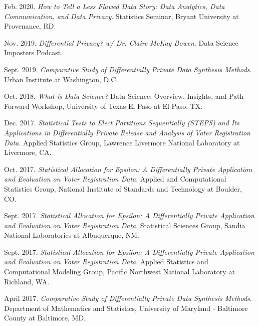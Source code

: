 \documentclass[11pt, letterpaper, roman]{moderncv} %
\begin{document}
\begin{etaremune}[topsep=0pt, itemsep=6pt, partopsep=0pt, parsep=0pt]
  \item Feb. 2020. \textit{How to Tell a Less Flawed Data Story: Data Analytics, Data Communication, and Data Privacy}. Statistics Seminar, Bryant University at Provenance, RD.
  
  \item Nov. 2019. \textit{Differential Privacy? w/ Dr. Claire McKay Bowen}. Data Science Imposters Podcast.
  
  \item Sept. 2019. \textit{Comparative Study of Differentially Private Data Synthesis Methods}. Urban Institute at Washington, D.C.
  
  \item Oct. 2018. \textit{What is Data Science?} Data Science: Overview, Insights, and Path Forward Workshop, University of Texas-El Paso at El Paso, TX.

  \item Dec. 2017. \textit{Statistical Tests to Elect Partitions Sequentially (STEPS) and Its Applications in Differentially Private Release and Analysis of Voter Registration Data}. Applied Statistics Group, Lawrence Livermore National Laboratory at Livermore, CA.
  
  \item Oct. 2017. \textit{Statistical Allocation for Epsilon: A Differentially Private Application and Evaluation on Voter Registration Data}. Applied and Computational Statistics Group, National Institute of Standards and Technology at Boulder, CO.
  
  \item Sept. 2017. \textit{Statistical Allocation for Epsilon: A Differentially Private Application and Evaluation on Voter Registration Data}. Statistical Sciences Group, Sandia National Laboratories at Albuquerque, NM.
  
  \item Sept. 2017. \textit{Statistical Allocation for Epsilon: A Differentially Private Application and Evaluation on Voter Registration Data}. Applied Statistics and Computational Modeling Group, Pacific Northwest National Laboratory at Richland, WA.
  
  \item April 2017. \textit{Comparative Study of Differentially Private Data Synthesis Methods}. Department of Mathematics and Statistics, University of Maryland - Baltimore County at Baltimore, MD.
\end{etaremune}

\vspace{-10pt}
\end{document}
